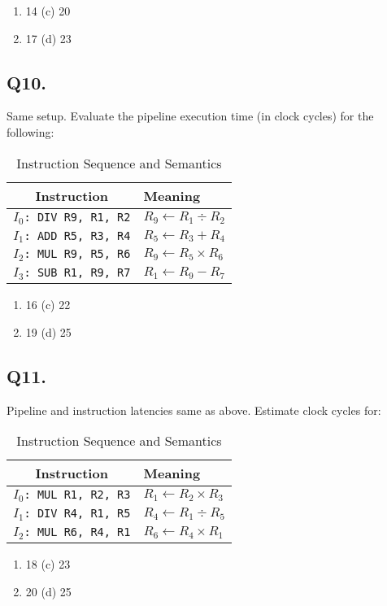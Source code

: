 \begin{enumerate}[label=(\alph*)]
    \item 14 \hspace{5cm} (c) 20
    \item 17 \hspace{5cm} (d) 23
\end{enumerate}

\subsection*{Q10.} Same setup. Evaluate the pipeline execution time (in clock cycles) for the following:

\begin{table}[H]
\centering
\renewcommand{\arraystretch}{1.3}
\begin{tabular}{|c|l|}
\hline
\textbf{Instruction} & \textbf{Meaning} \\
\hline
\texttt{$I_{0}$: DIV R9, R1, R2} & $R_9 \leftarrow R_1 \div R_2$ \\
\texttt{$I_{1}$: ADD R5, R3, R4} & $R_5 \leftarrow R_3 + R_4$ \\
\texttt{$I_{2}$: MUL R9, R5, R6} & $R_9 \leftarrow R_5 \times R_6$ \\
\texttt{$I_{3}$: SUB R1, R9, R7} & $R_1 \leftarrow R_9 - R_7$ \\
\hline
\end{tabular}
\caption{Instruction Sequence and Semantics}
\end{table}


\begin{enumerate}[label=(\alph*)]
    \item 16 \hspace{5cm} (c) 22
    \item 19 \hspace{5cm} (d) 25
\end{enumerate}

\subsection*{Q11.} Pipeline and instruction latencies same as above. Estimate clock cycles for:

\begin{table}[H]
\centering
\renewcommand{\arraystretch}{1.3}
\begin{tabular}{|c|l|}
\hline
\textbf{Instruction} & \textbf{Meaning} \\
\hline
\texttt{$I_{0}$: MUL R1, R2, R3} & $R_1 \leftarrow R_2 \times R_3$ \\
\texttt{$I_{1}$: DIV R4, R1, R5} & $R_4 \leftarrow R_1 \div R_5$ \\
\texttt{$I_{2}$: MUL R6, R4, R1} & $R_6 \leftarrow R_4 \times R_1$ \\
\hline
\end{tabular}
\caption{Instruction Sequence and Semantics}
\end{table}

\begin{enumerate}[label=(\alph*)]
    \item 18 \hspace{5cm} (c) 23
    \item 20 \hspace{5cm} (d) 25
\end{enumerate}
